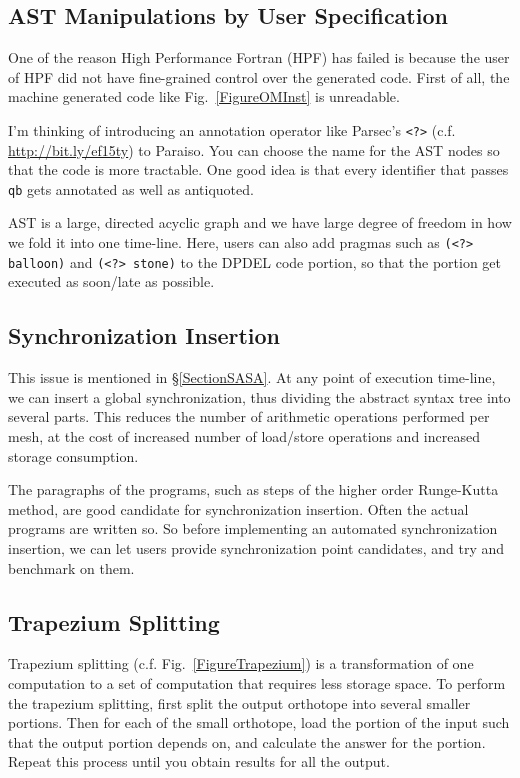 \documentclass[twocolumn]{article}
\begin{document}
\subsection{AST Manipulations by User Specification}
One of the reason High Performance Fortran (HPF) has failed
\cite{Kennedy:2007:RFH:1238844.1238851} is because the user of HPF did not
have fine-grained control over the generated code.  First of all, the machine
generated code like Fig.~\ref{FigureOMInst} is unreadable.

I'm thinking of introducing an annotation operator like Parsec's {\tt <?>}
(c.f. \url{http://bit.ly/ef15ty}) to Paraiso. You can choose the name for the
AST nodes so that the code is more tractable. One good idea is that every
identifier that passes {\tt qb} gets annotated as well as antiquoted.

AST is a large, directed acyclic graph and we have large degree of freedom in
how we fold it into one time-line. Here, users can also add pragmas such as
{\tt (<?> balloon)} and {\tt (<?> stone)} to the DPDEL code portion, so that the
portion get executed as soon/late as possible.

\subsection{Synchronization Insertion}

This issue is mentioned in \S\ref{SectionSASA}.  At any point of execution
time-line, we can insert a global synchronization, thus dividing the abstract
syntax tree into several parts. This reduces the number of arithmetic
operations performed per mesh, at the cost of increased number of load/store
operations and increased storage consumption.

The paragraphs of the programs, such as steps of the higher order Runge-Kutta
method, are good candidate for synchronization insertion. Often the actual
programs are written so. So before implementing an automated synchronization
insertion, we can let users provide synchronization point candidates, and try
and benchmark on them.

\subsection{Trapezium Splitting}

Trapezium splitting (c.f. Fig.~\ref{FigureTrapezium}) is a transformation of
one computation to a set of computation that requires less storage space. To
perform the trapezium splitting, first split the output orthotope into several
smaller portions. Then for each of the small orthotope, load the portion of
the input such that the output portion depends on, and calculate the answer
for the portion. Repeat this process until you obtain results for all the
output.
\end{document}
